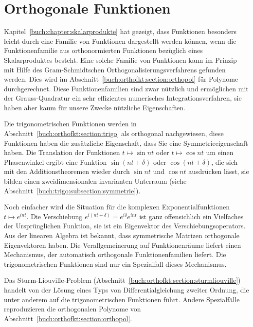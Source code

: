 %
%
%
\chapter{Orthogonale Funktionen
\label{buch:chapter:orthofunkt}}
Kapitel~\ref{buch:chapter:skalarprodukte} hat gezeigt, dass Funktionen
besonders leicht durch eine Familie von Funktionen dargestellt werden 
können, wenn die Funktionenfamilie aus orthonormierten Funktionen
bezüglich eines Skalarproduktes besteht.
Eine solche Familie von Funktionen kann im Prinzip mit Hilfe des
Gram-Schmidtschen Orthogonalisierungsverfahrens gefunden werden.
Dies wird im Abschnitt~\ref{buch:orthofkt:section:orthopol} für
Polynome durchgerechnet.
Diese Funktionenfamilien sind zwar nützlich und ermöglichen mit
der Grauss-Quadratur ein sehr effizientes numerisches
Integrationsverfahren, sie haben aber kaum für unsere Zwecke
nützliche Eigenschaften.

Die trigonometrischen Funktionen werden in
Abschnitt~\ref{buch:orthofkt:section:trigo} als orthogonal nachgewiesen,
diese Funktionen haben die zusätzliche Eigenschaft, dass Sie eine
Symmetrieeigenschaft haben.
Die Translation der Funktionen $t\mapsto \sin nt$ oder
$t\mapsto\cos nt$ um einen Phasenwinkel ergibt eine Funktion
$\sin(nt+\delta)$ oder $\cos(nt+\delta)$, die sich mit den Additionstheoremen
wieder durch $\sin nt$ und $\cos nt$ ausdrücken lässt, sie bilden 
einen zweidimensionalen invarianten Unterraum
(siehe Abschnitt~\ref{buch:trigo:subsection:symmetrie}).

Noch einfacher wird die Situation für die komplexen Exponentialfunktionen
$t\mapsto e^{int}$.
Die Verschiebung $e^{i(nt+\delta)}=e^{i\delta}e^{int}$ ist ganz
offensichlich ein Vielfaches der Ursprünglichen Funktion, sie ist
ein Eigenvektor des Verschiebungsoperators.
Aus der linearen Algebra ist bekannt, dass symmetrische Matrizen 
orthogonale Eigenvektoren haben.
Die Verallgemeinerung auf Funktionenräume liefert einen Mechanismus,
der automatisch orthogonale Funktionenfamilien liefert.
Die trigonometrischen Funktionen sind nur ein Spezialfall dieses
Mechanismus.

Das Sturm-Liouville-Problem
(Abschnitt~\ref{buch:orthofkt:section:sturmliouville})
handelt von der Lösung eines Typs
von Differentialgleichung zweiter Ordnung, die unter anderem auf
die trigonometrischen Funktionen führt.
Andere Spezialfälle reproduzieren die orthogonalen Polynome
von Abschnitt~\ref{buch:orthofkt:section:orthopol}.

